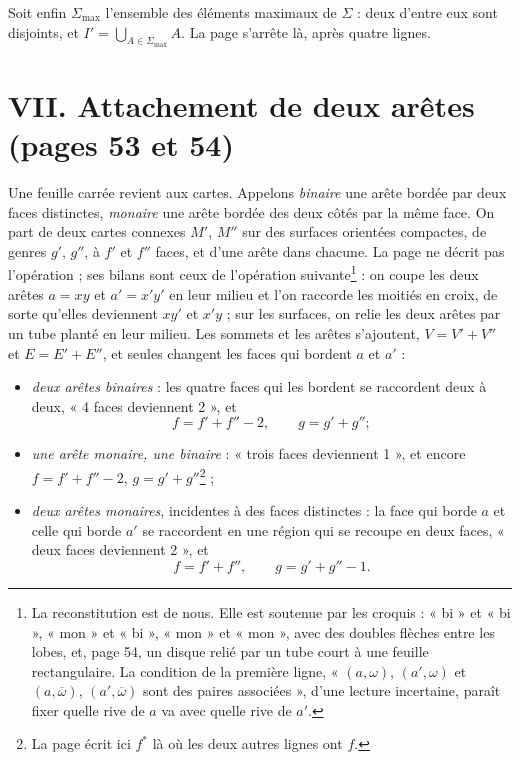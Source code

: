 \documentclass[11pt,a4paper]{article}
\begin{document}
Soit enfin $\Sigma_{\max}$ l'ensemble des éléments maximaux de $\Sigma$ :
deux d'entre eux sont disjoints, et $I' = \bigcup_{A \in \Sigma_{\max}} A$. La
page s'arrête là, après quatre lignes.

\section*{VII. Attachement de deux arêtes (pages 53 et 54)}

Une feuille carrée revient aux cartes. Appelons \emph{binaire} une arête
bordée par deux faces distinctes, \emph{monaire} une arête bordée des deux
côtés par la même face. On part de deux cartes connexes $M'$, $M''$ sur des
surfaces orientées compactes, de genres $g'$, $g''$, à $f'$ et $f''$ faces,
et d'une arête dans chacune. La page ne décrit pas l'opération ; ses bilans
sont ceux de l'opération suivante\footnote{La reconstitution est de nous.
Elle est soutenue par les croquis : « bi » et « bi », « mon » et « bi »,
« mon » et « mon », avec des doubles flèches entre les lobes, et, page 54, un
disque relié par un tube court à une feuille rectangulaire. La condition de
la première ligne, « $(a,\omega)$, $(a',\omega)$ et $(a,\overline{\omega})$,
$(a',\overline{\omega})$ sont des paires associées », d'une lecture
incertaine, paraît fixer quelle rive de $a$ va avec quelle rive de $a'$.} :
on coupe les deux arêtes $a = xy$ et $a' = x'y'$ en leur milieu et l'on
raccorde les moitiés en croix, de sorte qu'elles deviennent $xy'$ et $x'y$ ;
sur les surfaces, on relie les deux arêtes par un tube planté en leur
milieu. Les sommets et les arêtes s'ajoutent, $V = V' + V''$ et $E = E'
+ E''$, et seules changent les faces qui bordent $a$ et $a'$ :
\begin{itemize}
  \item \emph{deux arêtes binaires} : les quatre faces qui les bordent se
  raccordent deux à deux, « 4 faces deviennent 2 », et
  \[
  f = f' + f'' - 2, \qquad g = g' + g'' ;
  \]
  \item \emph{une arête monaire, une binaire} : « trois faces deviennent 1 »,
  et encore $f = f' + f'' - 2$, $g = g' + g''$\footnote{La page écrit ici
  $f^{*}$ là où les deux autres lignes ont $f$.} ;
  \item \emph{deux arêtes monaires}, incidentes à des faces distinctes : la
  face qui borde $a$ et celle qui borde $a'$ se raccordent en une région qui
  se recoupe en deux faces, « deux faces deviennent 2 », et
  \[
  f = f' + f'', \qquad g = g' + g'' - 1 .
  \]
\end{itemize}
\end{document}
